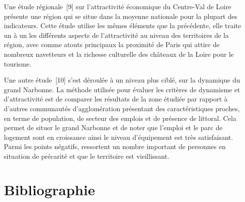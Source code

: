 \documentclass{article}
\begin{document}
\bigbreak

Une étude régionale~[9] sur l'attractivité économique du Centre-Val de Loire présente une région qui se situe dans la moyenne nationale pour la plupart des indicateurs. Cette étude utilise les mêmes éléments que la précédente, elle traite un à un les différents aspects de l'attractivité au niveau des territoires de la région, avec comme atouts principaux la proximité de Paris qui attire de nombreux navetteurs et la richesse culturelle des châteaux de la Loire pour le tourisme.

\bigbreak

Une autre étude~[10] s'est déroulée à un niveau plus ciblé, sur la dynamique du grand Narbonne. La méthode utilisée pour évaluer les critères de dynamisme et d’attractivité est de comparer les résultats de la zone étudiée par rapport à d'autres communautés d'agglomération présentant des caractéristiques proches, en terme de population, de secteur des emplois et de présence de littoral. Cela permet de situer le grand Narbonne et de noter que l'emploi et le parc de logement sont en croissance ainsi le niveau d'équipement est très satisfaisant. Parmi les points négatifs, ressortent un nombre important de personnes en situation de précarité et que le territoire est vieillissant.

\section*{Bibliographie}
\end{document}
